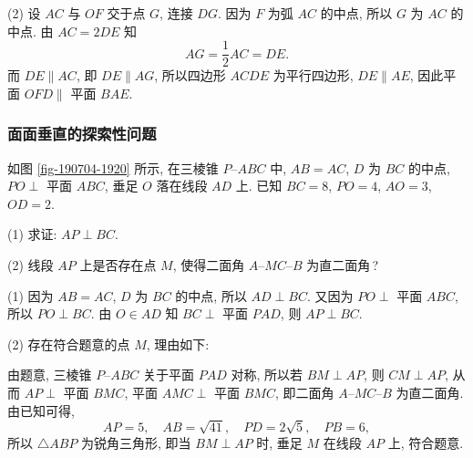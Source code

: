     (2) 设 $AC$ 与 $OF$ 交于点 $G$, 连接 $DG$. 因为 $F$ 为弧 $AC$ 的中点, 所以 $G$ 为 $AC$ 的中点. 由 $AC=2DE$ 知 
    \[AG= \frac12 AC= DE.\]
    而 $DE\parallel AC$, 即 $DE\parallel AG$, 所以四边形 $ACDE$ 为平行四边形, $DE\parallel AE$, 因此平面 $OFD\parallel $ 平面 $BAE$.
\endsolution
    
\subsubsection{面面垂直的探索性问题}
\begin{example}
    如图 \ref{fig-190704-1920} 所示, 在三棱锥 $P\text{--}ABC$ 中, $AB=AC$, $D$ 为 $BC$ 的中点, $PO\perp$ 平面 $ABC$, 垂足 $O$ 落在线段 $AD$ 上. 已知 $BC=8$, $PO=4$, $AO=3$, $OD=2$.
    
    (1) 求证: $AP\perp BC$.
    
    (2) 线段 $AP$ 上是否存在点 $M$, 使得二面角 $A\text{--}MC\text{--}B$ 为直二面角\,?
\end{example}
\beginsolution
    (1) 因为 $AB=AC$, $D$ 为 $BC$ 的中点, 所以 $AD\perp BC$. 又因为 $PO\perp$ 平面 $ABC$, 所以 $PO\perp BC$. 由 $O\in AD$ 知 $BC\perp$ 平面 $PAD$, 则 $AP\perp BC$.

    (2) 存在符合题意的点 $M$, 理由如下:

    由题意, 三棱锥 $P\text{--}ABC$ 关于平面 $PAD$ 对称, 所以若 $BM\perp AP$, 则 $CM\perp AP$, 从而 $AP\perp$ 平面 $BMC$, 平面 $AMC\perp$ 平面 $BMC$, 即二面角 $A\text{--}MC\text{--}B$ 为直二面角. 由已知可得, 
    \[AP=5,\quad AB=\sqrt{41},\quad
        PD= 2\sqrt5,\quad PB=6,\]
    所以 $\triangle ABP$ 为锐角三角形, 即当 $BM\perp AP$ 时, 垂足 $M$ 在线段 $AP$ 上, 符合题意.
\endsolution

